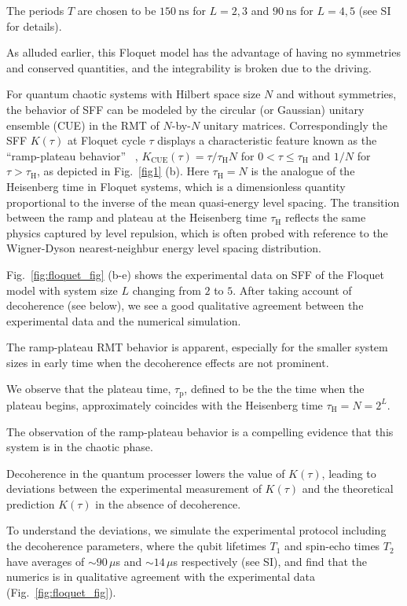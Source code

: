 \documentclass[aps,prx,reprint,twocolumn,superscriptaddress,floatfix,nofootinbib]{revtex4-2}
\newcommand{\tauhei}{\tau_{\mathrm{H}}}
\newcommand{\tauplateau}{\tau_{\mathrm{p}}}
\begin{document}
The periods $T$ are chosen to be $150~\text{ns}$ for $L=2,3$ and $90~\text{ns}$ for $L=4,5$  (see SI for details).

As alluded earlier, this Floquet model has the advantage of having no symmetries and conserved quantities, and the integrability is broken due to the driving.

For quantum chaotic systems with Hilbert space size $N$ and without symmetries, the behavior of SFF can be modeled by the circular (or Gaussian) unitary ensemble (CUE) in the RMT of $N$-by-$N$ unitary matrices. Correspondingly the SFF $K(\tau)$ at Floquet cycle $\tau$ displays a characteristic feature known as the ``ramp-plateau behavior''~ \cite{Mehta}, $K_{\mathrm{CUE}}(\tau)= {\tau}/{\tauhei N}$
for $0<\tau \leq \tauhei $ and $1/N$ for $\tau>\tauhei$, as depicted in Fig.~\ref{fig1} (b). Here  $\tauhei =  N $ is the analogue of the Heisenberg time in Floquet systems, which is a dimensionless quantity proportional to the inverse of the mean quasi-energy level spacing. The transition between the ramp and plateau at the Heisenberg time $\tauhei$ reflects the same physics captured by level repulsion, which is often probed with reference to the Wigner-Dyson nearest-neighbur energy level spacing distribution.

Fig.~\ref{fig:floquet_fig} (b-e) shows the experimental data on SFF of the Floquet model with system size $L$ changing from $2$ to $5$.
After taking account of decoherence (see below), we see a good qualitative agreement between the experimental data and the numerical simulation.

The ramp-plateau RMT behavior is apparent, especially for the smaller system sizes in early time when the decoherence effects are not prominent.

We observe that the plateau time, $\tauplateau$, defined to be the the time when the plateau begins, approximately coincides with the Heisenberg time $\tauhei = N= 2^L$.

The observation of the ramp-plateau behavior is a compelling evidence that this system is in the chaotic phase.

Decoherence in the quantum processer lowers the value of $K(\tau)$, leading to deviations between the experimental measurement of $K(\tau)$ and the theoretical prediction $K(\tau)$ in the absence of decoherence.

To understand the deviations, we simulate the experimental protocol including the decoherence parameters, where the qubit lifetimes $T_1$ and  spin-echo times $T_2$ have averages of $\sim 90 \,  \mu$s and $\sim 14 \, \mu $s respectively (see SI),
and find that the numerics is in qualitative agreement with the experimental data (Fig.~\ref{fig:floquet_fig}).
\end{document}

